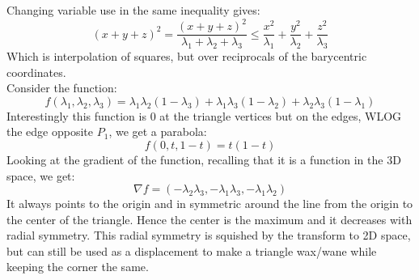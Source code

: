 Changing variable use in the same inequality gives:
\[(x+y+z)^2 = \frac{(x+y+z)^2}{\lambda_1+\lambda_2+\lambda_3} \leq \frac{x^2}{\lambda_1} +\frac{y^2}{\lambda_2} +\frac{z^2}{\lambda_3}\]
Which is interpolation of squares,
but over reciprocals of the barycentric coordinates.
\\
Consider the function:
\[f(\lambda_1,\lambda_2,\lambda_3) = \lambda_1\lambda_2(1-\lambda_3)+\lambda_1\lambda_3(1-\lambda_2)+\lambda_2\lambda_3(1-\lambda_1)\]
Interestingly this function is $0$ at the triangle vertices but on the edges, WLOG the edge opposite $P_1$, we get a parabola:
\[f(0,t,1-t) = t(1-t)\]
Looking at the gradient of the function,
recalling that it is a function in the 3D space,
we get:
\[\nabla f = (-\lambda_2\lambda_3,-\lambda_1\lambda_3,-\lambda_1\lambda_2)\]
It always points to the origin and in symmetric around the line from the origin to the center of the triangle.
Hence the center is the maximum and it decreases with radial symmetry.
This radial symmetry is squished by the transform to 2D space,
but can still be used as a displacement to make a triangle wax/wane while keeping the corner the same.


%

